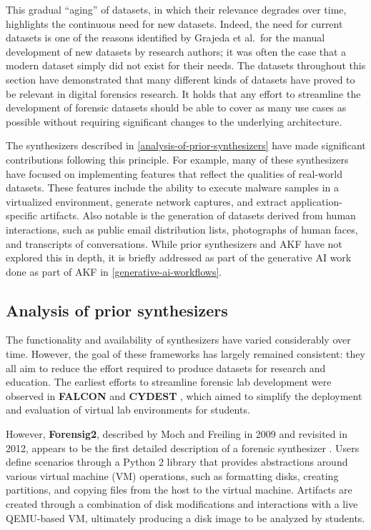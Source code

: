 \documentclass[preprint,12pt]{elsarticle}
\begin{document}
This gradual ``aging'' of datasets, in which their relevance degrades
over time, highlights the continuous need for new datasets. Indeed, the
need for current datasets is one of the reasons identified by Grajeda et
al.~for the manual development of new datasets by research authors; it
was often the case that a modern dataset simply did not exist for their
needs. The datasets throughout this section have demonstrated that many
different kinds of datasets have proved to be relevant in digital
forensics research. It holds that any effort to streamline the
development of forensic datasets should be able to cover as many use
cases as possible without requiring significant changes to the
underlying architecture.

The synthesizers described in \autoref{analysis-of-prior-synthesizers}
have made significant contributions following this principle. For
example, many of these synthesizers have focused on implementing
features that reflect the qualities of real-world datasets. These
features include the ability to execute malware samples in a virtualized
environment, generate network captures, and extract application-specific
artifacts. Also notable is the generation of datasets derived from human
interactions, such as public email distribution lists, photographs of
human faces, and transcripts of conversations. While prior synthesizers
and AKF have not explored this in depth, it is briefly addressed as part
of the generative AI work done as part of AKF in \autoref{generative-ai-workflows}.

\subsection{Analysis of prior
synthesizers}\label{analysis-of-prior-synthesizers}

The functionality and availability of synthesizers have varied
considerably over time. However, the goal of these frameworks has
largely remained consistent: they all aim to reduce the effort required
to produce datasets for research and education. The earliest efforts to
streamline forensic lab development were observed in \textbf{FALCON}
\citep{adelsteinAutomaticallyCreatingRealistic2005} and
\textbf{CYDEST} \citep{bruecknerAutomatedComputerForensics2008},
which aimed to simplify the deployment and evaluation of virtual lab
environments for students.

However, \textbf{Forensig2}, described by Moch and Freiling in 2009 and
revisited in 2012, appears to be the first detailed description of a
forensic synthesizer
\citep{mochForensicImageGenerator2009,mochEvaluatingForensicImage2012}.
Users define scenarios through a Python 2 library that provides
abstractions around various virtual machine (VM) operations, such as
formatting disks, creating partitions, and copying files from the host
to the virtual machine. Artifacts are created through a combination of
disk modifications and interactions with a live QEMU-based VM,
ultimately producing a disk image to be analyzed by students.
\end{document}
